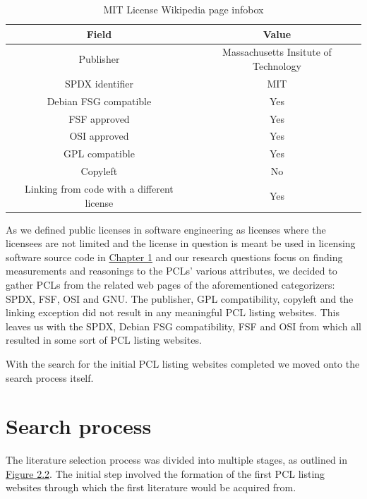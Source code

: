 \begin{table}[t]
	\begin{center}
		\begin{tabular}{||c c||}
			\hline
			Field & Value \\
			\hline
			Publisher & Massachusetts Insitute of Technology \\
			SPDX identifier & MIT \\
			Debian FSG compatible & Yes \\
			FSF approved & Yes \\
			OSI approved & 	Yes \\
			GPL compatible & Yes \\
			Copyleft & No \\
			Linking from code with a different license & Yes \\
			\hline
		\end{tabular}
		\caption{MIT License Wikipedia page infobox}
		\label{table:infobox}
	\end{center}
\end{table}

As we defined public licenses in software engineering as licenses where the licensees are not limited and the license in question is meant be used in licensing software source code in \hyperref[intro]{Chapter 1} and our research questions focus on finding measurements and reasonings to the PCLs' various attributes, we decided to gather PCLs from the related web pages of the aforementioned categorizers: SPDX, FSF, OSI and GNU. The publisher, GPL compatibility, copyleft and the linking exception did not result in any meaningful PCL listing websites. This leaves us with the SPDX, Debian FSG compatibility, FSF and OSI from which all resulted in some sort of PCL listing websites.

With the search for the initial PCL listing websites completed we moved onto the search process itself.

\section{Search process}
The literature selection process was divided into multiple stages, as outlined in \hyperref[fig:search-process]{Figure 2.2}. The initial step involved the formation of the first PCL listing websites through which the first literature would be acquired from.

